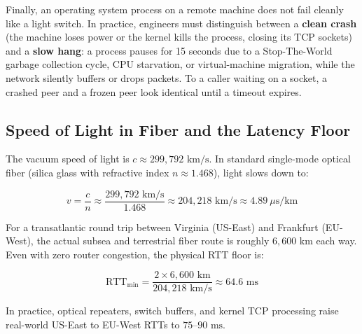 Finally, an operating system process on a remote machine does not fail cleanly like a light switch. In practice, engineers must distinguish between a \textbf{clean crash} (the machine loses power or the kernel kills the process, closing its TCP sockets) and a \textbf{slow hang}: a process pauses for 15 seconds due to a Stop-The-World garbage collection cycle, CPU starvation, or virtual-machine migration, while the network silently buffers or drops packets. To a caller waiting on a socket, a crashed peer and a frozen peer look identical until a timeout expires.

\subsection{Speed of Light in Fiber and the Latency Floor}

The vacuum speed of light is $c \approx 299{,}792\text{ km/s}$. In standard single-mode optical fiber (silica glass with refractive index $n \approx 1.468$), light slows down to:

\begin{equation}
v = \frac{c}{n} \approx \frac{299{,}792\text{ km/s}}{1.468} \approx 204{,}218\text{ km/s} \approx 4.89\ \mu\text{s/km}
\end{equation}

For a transatlantic round trip between Virginia (US-East) and Frankfurt (EU-West), the actual subsea and terrestrial fiber route is roughly $6{,}600\text{ km}$ each way. Even with zero router congestion, the physical RTT floor is:

\begin{equation}
\text{RTT}_{\text{min}} = \frac{2 \times 6{,}600\text{ km}}{204{,}218\text{ km/s}} \approx 64.6\text{ ms}
\end{equation}

In practice, optical repeaters, switch buffers, and kernel TCP processing raise real-world US-East to EU-West RTTs to $75\text{--}90\text{ ms}$.

